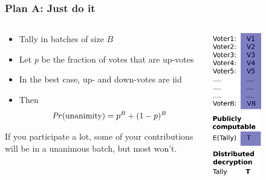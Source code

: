 \documentclass[10pt,xcolor=svgnames,169]{beamer} %
\begin{document}
\begin{frame}
	\frametitle{Plan A: Just do it}
	
	\begin{columns}
		\begin{column}{0.7\textwidth}
	\begin{itemize}
		\item Tally in batches of size $B$
		\item Let  $p$ be the fraction of votes that are up-votes
		\item In the best case, up- and down-votes are iid 
		\item Then $$\mathit{Pr}(\text{unanimity}) = p^B + (1-p)^B$$
	\end{itemize}	
If you participate a lot, some of your contributions will be in a unanimous batch, but most won't.	
		\end{column}
		\begin{column}{0.3\textwidth}  %
			\begin{center}
				\includegraphics[width=0.5\textwidth]{homomorphicAddition_simple}
			\end{center}
		\end{column}
	\end{columns}
	

	


\end{frame}
\end{document}
